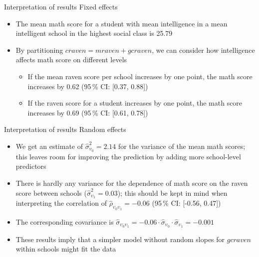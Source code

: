 \documentclass{beamer}
\begin{document}
\begin{frame}{Interpretation of results}
Fixed effects
  \begin{itemize}
    \item The mean math score for a student with mean intelligence in a
          mean intelligent school in the highest social class is 25.79
    \item By partitioning $craven = mraven + gcraven$, we can consider how
      intelligence affects math score on different levels
      \begin{itemize}
        \item If the mean raven score per school increases by one point,
          the math score increases by 0.62 (95\,\% CI: [0.37, 0.88])
        \item If the raven score for a student increases by one point, the
          math score increases by 0.69 (95\,\% CI: [0.61, 0.78])
      \end{itemize}
  \end{itemize}
\end{frame}

\begin{frame}{Interpretation of results}
Random effects
  \begin{itemize}
    \item We get an estimate of $\hat \sigma^2_{\upsilon_{0}} = 2.14$ for
      the variance of the mean math scores; this leaves room for improving
      the prediction by adding more school-level predictors
    \item There is hardly any variance for the dependence of math score on
      the raven score between schools ($\hat \sigma^2_{\upsilon_{1}} =
      0.03$); this should be kept in mind when interpreting the correlation
      of $\hat \rho_{\upsilon_{0}\upsilon_1} = -0.06$ (95\,\% CI: [-0.56,
      0.47])
    \item The corresponding covariance is $\hat
      \sigma_{\upsilon_{0}\upsilon_1} = -0.06 \cdot \hat
      \sigma_{\upsilon_{0}} \cdot \hat \sigma_{\upsilon_{1}} = -0.001$
    \item These results imply that a simpler model without random slopes for
      $gcraven$ within schools might fit the data
  \end{itemize}
\end{frame}


% 
% 
% 

% 
% 
\end{document}
